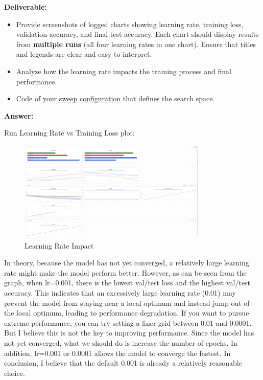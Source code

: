 \documentclass[11pt, oneside]{article}   	%
\begin{document}
\noindent\textbf{Deliverable:}
\begin{itemize}
    \item Provide screenshots of logged charts showing learning rate, training loss, validation accuracy, and final test accuracy. Each chart should display results from \textbf{multiple runs} (all four learning rates in one chart). Ensure that titles and legends are clear and easy to interpret.
    \item Analyze how the learning rate impacts the training process and final performance.
    \item Code of your \href{https://docs.wandb.ai/guides/sweeps/define-sweep-configuration}{sweep configuration} that defines the search space.
\end{itemize}

\begin{answerbox} \textbf{Answer:} \vspace*{1cm}

Run Learning Rate vs Training Loss plot:

\begin{figure}[h]
    \centering
    \includegraphics[width=0.8\textwidth]{images/lr.png}
    \caption{Learning Rate Impact}
\end{figure}

In theory, because the model has not yet converged, a relatively large learning rate might make the model perform better. However, as can be seen from the graph, when lr=0.001, there is the lowest val/test loss and the highest val/test accuracy. This indicates that an excessively large learning rate (0.01) may prevent the model from staying near a local optimum and instead jump out of the local optimum, leading to performance degradation. If you want to pursue extreme performance, you can try setting a finer grid between 0.01 and 0.0001. But I believe this is not the key to improving performance. Since the model has not yet converged, what we should do is increase the number of epochs. In addition, lr=0.001 or 0.0001 allows the model to converge the fastest. In conclusion, I believe that the default 0.001 is already a relatively reasonable choice.


\end{answerbox}
\end{document}
